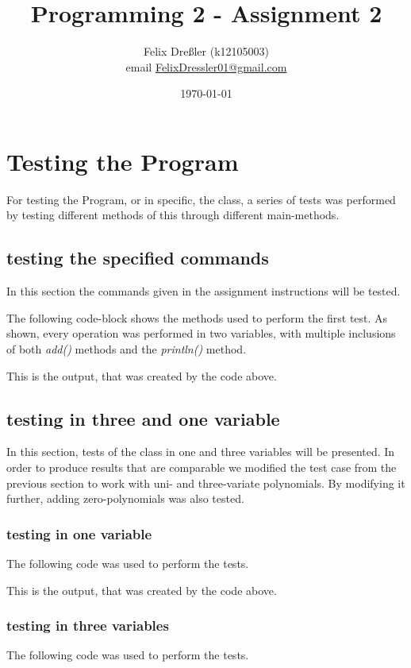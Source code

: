 \documentclass[11pt,titlepage]{article}
\title{Programming 2 - Assignment 2}
\author{Felix Dreßler (k12105003)\\ email \href{mailto:FelixDressler01@gmail.com}{FelixDressler01@gmail.com}}
\date{\today} %
\begin{document}
\maketitle
	\section{Testing the Program}
	For testing the Program, or in specific, the class, a series of tests was performed by testing different methods of this through different main-methods.
	
	\subsection{testing the specified commands}
	In this section the commands given in the assignment instructions will be tested.
	
	The following code-block shows the methods used to perform the first test. As shown, every operation was performed in two variables, with multiple inclusions of both \emph{add()} methods and the \emph{println()} method.
		
		
	This is the output, that was created by the code above.
		
		
\newpage	
	\subsection{testing in three and one variable}
	In this section, tests of the class in one and three variables will be presented. In order to produce results that are comparable we modified the test case from the previous section to work with uni- and three-variate polynomials.
	By modifying it further, adding zero-polynomials was also tested.
	
		\subsubsection{testing in one variable}
		The following code was used to perform the tests.
			
	
		This is the output, that was created by the code above.
			
\newpage		
		\subsubsection{testing in three variables}
		The following code was used to perform the tests.
			
			
\end{document}
